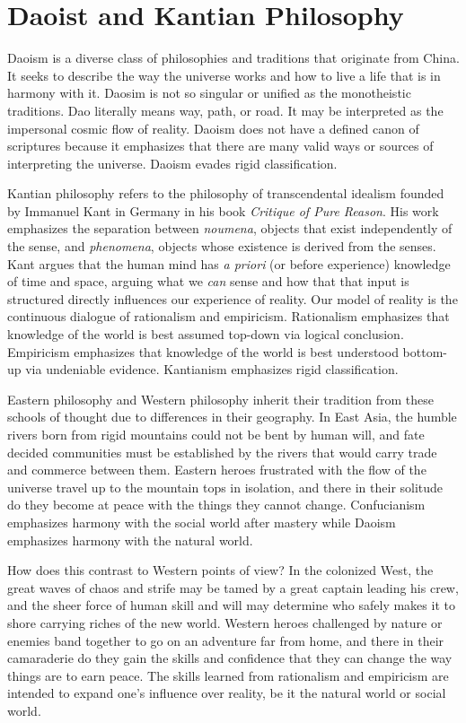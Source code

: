 \documentclass[10pt, a5paper, twoside, openright]{memoir}
\begin{document}
\chapter{Daoist and Kantian Philosophy}
Daoism is a diverse class of philosophies and traditions that originate from China. It seeks to describe the way the universe works and how to live a life that is in harmony with it. Daosim is not so singular or unified as the monotheistic traditions. Dao literally means way, path, or road. It may be interpreted as the impersonal cosmic flow of reality. Daoism does not have a defined canon of scriptures because it emphasizes that there are many valid ways or sources of interpreting the universe. Daoism evades rigid classification.

Kantian philosophy refers to the philosophy of transcendental idealism founded by Immanuel Kant in Germany in his book \textit{Critique of Pure Reason}. His work emphasizes the separation between \textit{noumena}, objects that exist independently of the sense, and \textit{phenomena}, objects whose existence is derived from the senses. Kant argues that the human mind has \textit{a priori} (or before experience) knowledge of time and space, arguing what we \textit{can} sense and how that that input is structured directly influences our experience of reality. Our model of reality is the continuous dialogue of rationalism and empiricism. Rationalism emphasizes that knowledge of the world is best assumed top-down via logical conclusion. Empiricism emphasizes that knowledge of the world is best understood bottom-up via undeniable evidence. Kantianism emphasizes rigid classification.

Eastern philosophy and Western philosophy inherit their tradition from these schools of thought due to differences in their geography. In East Asia, the humble rivers born from rigid mountains could not be bent by human will, and fate decided communities must be established by the rivers that would carry trade and commerce between them. Eastern heroes frustrated with the flow of the universe travel up to the mountain tops in isolation, and there in their solitude do they become at peace with the things they cannot change. Confucianism emphasizes harmony with the social world after mastery while Daoism emphasizes harmony with the natural world.

How does this contrast to Western points of view? In the colonized West, the great waves of chaos and strife may be tamed by a great captain leading his crew, and the sheer force of human skill and will may determine who safely makes it to shore carrying riches of the new world. Western heroes challenged by nature or enemies band together to go on an adventure far from home, and there in their camaraderie do they gain the skills and confidence that they can change the way things are to earn peace. The skills learned from rationalism and empiricism are intended to expand one's influence over reality, be it the natural world or social world.
\end{document}
